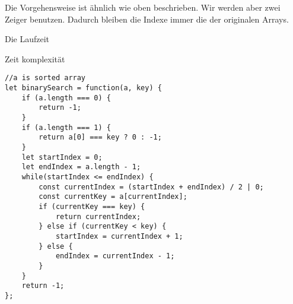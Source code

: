 \documentclass{book}
\begin{document}
Die Vorgehensweise ist ähnlich wie oben beschrieben. Wir werden aber zwei Zeiger benutzen. Dadurch bleiben die Indexe immer die der originalen Arrays.

Die Laufzeit

Zeit komplexität

\begin{lstlisting}[caption=My Javascript Example]
//a is sorted array
let binarySearch = function(a, key) {
	if (a.length === 0) {
		return -1;
	}
	if (a.length === 1) {
		return a[0] === key ? 0 : -1;
	}
	let startIndex = 0;
	let endIndex = a.length - 1;
	while(startIndex <= endIndex) {
		const currentIndex = (startIndex + endIndex) / 2 | 0;
		const currentKey = a[currentIndex];
		if (currentKey === key) {
			return currentIndex;
		} else if (currentKey < key) {
			startIndex = currentIndex + 1;
		} else {
			endIndex = currentIndex - 1;
		}
	}
	return -1;
};
\end{lstlisting}
\end{document}
